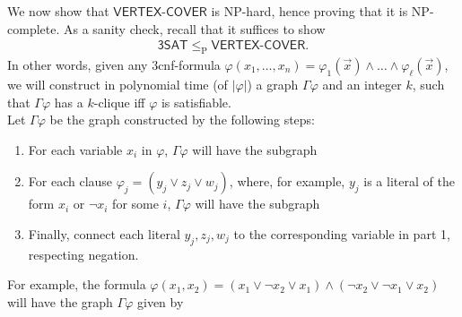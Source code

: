 \documentclass[10pt]{article}
\begin{document}
We now show that \(\textsf{VERTEX-COVER}\) is NP-hard, hence proving that it is NP-complete. As a sanity check, recall that it suffices to show
\begin{align*}
	\textsf{3SAT} \leq_{\text{P}} \textsf{VERTEX-COVER}.
\end{align*}
In other words, given any 3cnf-formula \(\varphi(x_1, \dots, x_n) = \varphi_1(\vec{x}) \land \dots \land \varphi_\ell(\vec{x})\), we will construct in polynomial time (of \(|\varphi|\)) a graph \(\Gamma \varphi\) and an integer \(k\), such that \(\Gamma\varphi\) has a  \(k\)-clique iff \(\varphi\) is satisfiable.\\

Let \(\Gamma \varphi\) be the graph constructed by the following steps:
\begin{enumerate}
	\item For each variable \(x_i\) in \(\varphi\), \(\Gamma \varphi\) will have the subgraph
\begin{center}
\end{center}
\item For each clause \(\varphi_j = (y_j \lor z_j \lor w_j)\), where, for example, \(y_j\) is a literal of the form \(x_i\) or \(\lnot x_i\) for some  \(i\), \(\Gamma \varphi\) will have the subgraph
\begin{center}
\end{center}
\item Finally, connect each literal \(y_j, z_j, w_j\) to the corresponding variable in part 1, respecting negation.
\end{enumerate}

For example, the formula \(\varphi(x_1, x_2) = (x_1 \lor \lnot x_2 \lor x_1) \land (\lnot x_2\lor  \lnot x_1 \lor x_2)\) will have the graph \(\Gamma \varphi\) given by
\begin{center}
\end{center}
\end{document}
